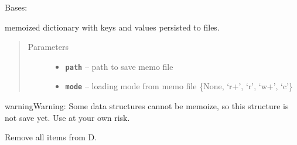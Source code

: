 \documentclass[letterpaper,10pt,english]{sphinxmanual}
\begin{document}
\begin{fulllineitems}
\label{RRtoolbox.lib:RRtoolbox.lib.cache.MemoizedDict}
Bases: 

memoized dictionary with keys and values persisted to files.
\begin{quote}\begin{description}
\item[{Parameters}] \leavevmode\begin{itemize}
\item {} 
\textbf{\texttt{path}} -- path to save memo file

\item {} 
\textbf{\texttt{mode}} -- loading mode from memo file \{None, `r+', `r', `w+', `c'\}

\end{itemize}

\end{description}\end{quote}

\begin{notice}{warning}{Warning:}
Some data structures cannot be memoize, so this structure is not save yet.
Use at your own risk.
\end{notice}

\begin{fulllineitems}
\label{RRtoolbox.lib:RRtoolbox.lib.cache.MemoizedDict.clear}
Remove all items from D.

\end{fulllineitems}


\end{fulllineitems}

\end{document}
